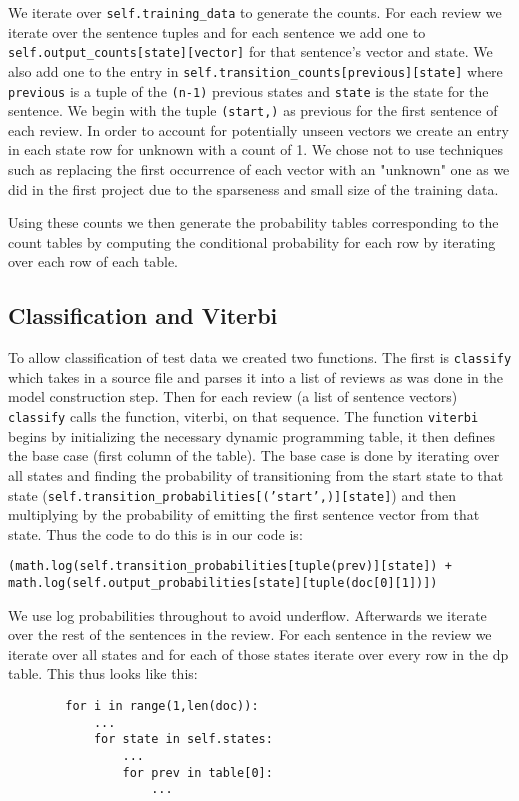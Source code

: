 \documentclass{article}
\begin{document}
We iterate over \texttt{self.training\_data} to generate the counts. For each review we iterate over the sentence tuples and for each sentence we add one to \texttt{self.output\_counts[state][vector]} for that sentence's vector and state. We also add one to the entry in  \texttt{self.transition\_counts[previous][state]} where \texttt{previous} is a tuple of the \texttt{(n-1)} previous states and \texttt{state} is the state for the sentence. We begin with the tuple \texttt{(start,)} as previous for the first sentence of each review. In order to account for potentially unseen vectors we create an entry in each state row for unknown with a count of 1. We chose not to use techniques such as replacing the first occurrence of each vector with an "unknown" one as we did in the first project due to the sparseness and small size of the training data. 

Using these counts we then generate the probability tables corresponding to the count tables by computing the conditional probability for each row by iterating over each row of each table.
 
\subsection{Classification and Viterbi}

To allow classification of test data we created two functions. The first is \texttt{classify} which takes in a source file and parses it into a list of reviews as was done in the model construction step. Then for each review (a list of sentence vectors) \texttt{classify} calls the function, viterbi, on that sequence. The function \texttt{viterbi} begins by initializing the necessary dynamic programming table, it then defines the base case (first column of the table). The base case is done by iterating over all states and finding the probability of transitioning from the start state to that state (\texttt{self.transition\_probabilities[('start',)][state]}) and then multiplying by the probability of emitting the first sentence vector from that state. Thus the code to do this is in our code is:
\begin{verbatim}
(math.log(self.transition_probabilities[tuple(prev)][state]) + math.log(self.output_probabilities[state][tuple(doc[0][1])])
\end{verbatim}

We use log probabilities throughout to avoid underflow. Afterwards we iterate over the rest of the sentences in the review. For each sentence in the review we iterate over all states and for each of those states iterate over every row in the dp table. This thus looks like this:
\begin{verbatim}
        for i in range(1,len(doc)):
            ...
            for state in self.states:
                ...
                for prev in table[0]:
                    ...
\end{verbatim}
\end{document}
